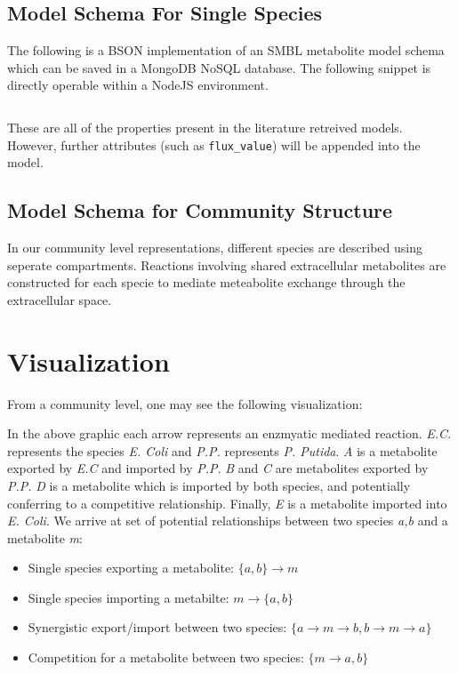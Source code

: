 \subsection{Model Schema For Single Species}

The following is a BSON implementation of an SMBL metabolite model schema which
can be saved in a MongoDB NoSQL database. The following snippet is directly
operable within a NodeJS environment.

\inputminted{js}{snippets/MetabolicModel.js}

These are all of the properties present in the literature retreived models.
However, further attributes (such as \texttt{flux\_value}) will be appended
into the model.

\subsection{Model Schema for Community Structure}

In our community level representations, different species are described using
seperate compartments. Reactions involving shared extracellular metabolites
are constructed for each specie to mediate meteabolite exchange through the
extracellular space.

\section{Visualization}

From a community level, one may see the following visualization:



In the above graphic each arrow represents an enzmyatic mediated reaction.
\textit{E.C.} represents the species \textit{E. Coli} and \textit{P.P.}
represents \textit{P. Putida}. \textit{A} is a metabolite exported by
\textit{E.C} and imported by \textit{P.P}. \textit{B} and \textit{C} are
metabolites exported by \textit{P.P.} \textit{D} is a metabolite which is
imported by both species, and potentially conferring to a competitive
relationship. Finally, \textit{E} is a metabolite imported into \textit{E.
Coli}. We arrive at set of potential relationships between two species
\textit{a,b} and a metabolite \textit{m}:

\begin{itemize}

\item Single species exporting a metabolite: $\{a,b\} \rightarrow m$
\item Single species importing a metabilte: $m \rightarrow \{a,b\}$
\item Synergistic export/import between two species: $\{a \rightarrow m \rightarrow b, b \rightarrow m \rightarrow a \}$
\item Competition for a metabolite between two species: $\{m \rightarrow a,b \}$

\end{itemize}

